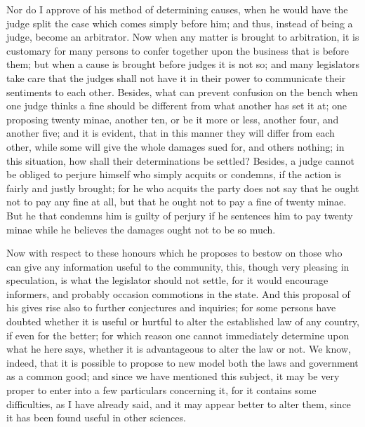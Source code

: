 Nor do I approve of his method of determining causes, when he would have
the judge split the case which comes simply before him; and thus, instead
of being a judge, become an arbitrator. Now when any matter is brought to
arbitration, it is customary for many persons to confer together upon the
business that is before them; but when a cause is brought before judges it
is not so; and many legislators take care that the judges shall not have
it in their power to communicate their sentiments to each other. Besides,
what can prevent confusion on the bench when one judge thinks a fine
should be different from what another has set it at; one proposing twenty
minae, another ten, or be it more or less, another four, and another five;
and it is evident, that in this manner they will differ from each other,
while some will give the whole damages sued for, and others nothing; in
this situation, how shall their determinations be settled? Besides, a
judge cannot be obliged to perjure himself who simply acquits or condemns,
if the action is fairly and justly brought; for he who acquits the party
does not say that he ought not to pay any fine at all, but that he ought
not to pay a fine of twenty minae. But he that condemns him is guilty of
perjury if he sentences him to pay twenty minae while he believes the
damages ought not to be so much.

Now with respect to these honours which he proposes to bestow on those who
can give any information useful to the community, this, though very
pleasing in speculation, is what the legislator should not settle, for it
would encourage informers, and probably occasion commotions in the state.
And this proposal of his gives rise also to further conjectures and
inquiries; for some persons have doubted whether it is useful or hurtful
to alter the established law of any country, if even for the better; for
which reason one cannot immediately determine upon what he here says,
whether it is advantageous to alter the law or not. We know, indeed, that
it is possible to propose to new model both the laws and government as a
common good; and since we have mentioned this subject, it may be very
proper to enter into a few particulars concerning it, for it contains some
difficulties, as I have already said, and it may appear better to alter
them, since it has been found useful in other sciences.

